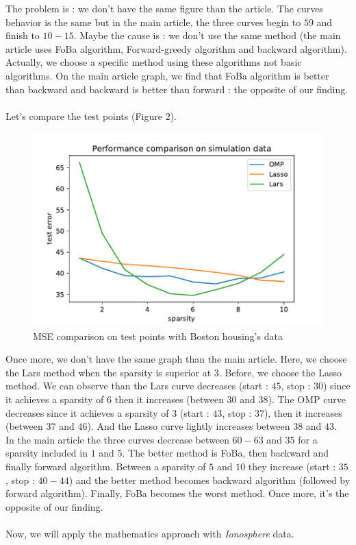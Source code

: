 \documentclass{article}
\begin{document}
The problem is : we don't have the same figure than the article. The curves behavior is the same but in the main article, the three curves begin to $59$ and finish to $10-15$. Maybe the cause is : we don't use the same method (the main article uses FoBa algorithm, Forward-greedy algorithm and backward algorithm). Actually, we choose a specific method using these algorithms not basic algorithms. On the main article graph, we find that FoBa algorithm is better than backward and backward is better than forward : the opposite of our finding.\\
\\
Let's compare the test points (Figure $2$).\\
\begin{figure}[!ht]
    \centering
    \includegraphics[scale=0.5]{./images/test_error_housing.pdf}
    \caption{MSE comparison on test points with Boston housing's data}
    \label{Figure 2}
\end{figure}
Once more, we don't have the same graph than the main article. Here, we choose the Lars method when the sparsity is superior at $3$. Before, we choose the Lasso method. We can observe than the Lars curve decreases (start : $45$, stop : $30$) since it achieves a sparsity of $6$ then it increases (between $30$ and $38$). The OMP curve decreases since it achieves a sparsity of $3$ (start : $43$, stop : $37$), then it increases (between $37$ and $46$). And the Lasso curve lightly increases between $38$ and $43$.\\
In the main article the three curves decrease between $60-63$ and $35$ for a sparsity included in $1$ and $5$. The better method is FoBa, then backward and finally forward algorithm. Between a sparsity of $5$ and $10$ they increase (start : $35$, stop : $40-44$) and the better method becomes backward algorithm (followed by forward algorithm). Finally, FoBa becomes the worst method. Once more, it's the opposite of our finding.\\
\\
Now, we will apply the mathematics approach with \textit{Ionosphere} data.
\end{document}
